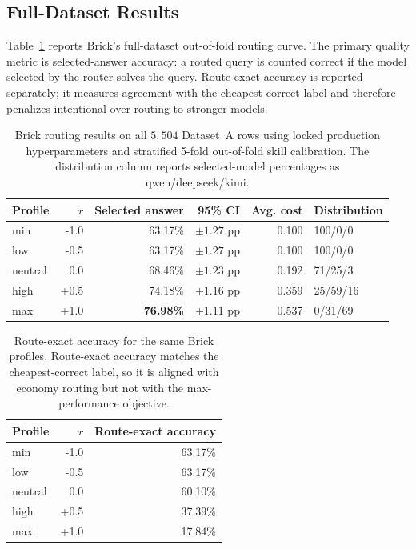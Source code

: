 \subsection{Full-Dataset Results}
\label{sec:routers-brick-results}

Table~\ref{tab:brick-routing-oof-results} reports Brick's full-dataset
out-of-fold routing curve. The primary quality metric is selected-answer
accuracy: a routed query is counted correct if the model selected by the router
solves the query. Route-exact accuracy is reported separately; it measures
agreement with the cheapest-correct label and therefore penalizes intentional
over-routing to stronger models.

\begin{table}[ht]
\centering
\caption{Brick routing results on all \(5{,}504\) Dataset~A rows using locked
production hyperparameters and stratified 5-fold out-of-fold skill calibration.
The distribution column reports selected-model percentages as
qwen/deepseek/kimi.}
\label{tab:brick-routing-oof-results}
\small
\begin{tabular}{l r r r r l}
\toprule
\textbf{Profile} & \textbf{\(r\)} & \textbf{Selected answer} &
\textbf{95\% CI} & \textbf{Avg. cost} & \textbf{Distribution} \\
\midrule
min     & -1.0 & 63.17\% & \(\pm 1.27\) pp & 0.100 & 100/0/0 \\
low     & -0.5 & 63.17\% & \(\pm 1.27\) pp & 0.100 & 100/0/0 \\
neutral & \phantom{-}0.0 & 68.46\% & \(\pm 1.23\) pp & 0.192 & 71/25/3 \\
high    & +0.5 & 74.18\% & \(\pm 1.16\) pp & 0.359 & 25/59/16 \\
max     & +1.0 & \textbf{76.98\%} & \(\pm 1.11\) pp & 0.537 & 0/31/69 \\
\bottomrule
\end{tabular}
\end{table}

\begin{table}[ht]
\centering
\caption{Route-exact accuracy for the same Brick profiles. Route-exact accuracy
matches the cheapest-correct label, so it is aligned with economy routing but
not with the max-performance objective.}
\label{tab:brick-routing-route-exact}
\small
\begin{tabular}{l r r}
\toprule
\textbf{Profile} & \textbf{\(r\)} & \textbf{Route-exact accuracy} \\
\midrule
min     & -1.0 & 63.17\% \\
low     & -0.5 & 63.17\% \\
neutral & \phantom{-}0.0 & 60.10\% \\
high    & +0.5 & 37.39\% \\
max     & +1.0 & 17.84\% \\
\bottomrule
\end{tabular}
\end{table}

